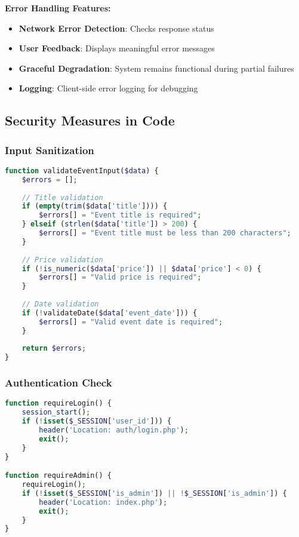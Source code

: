 \documentclass[12pt,a4paper]{article}
\begin{document}
\textbf{Error Handling Features:}
\begin{itemize}
    \item \textbf{Network Error Detection}: Checks response status
    \item \textbf{User Feedback}: Displays meaningful error messages
    \item \textbf{Graceful Degradation}: System remains functional during partial failures
    \item \textbf{Logging}: Client-side error logging for debugging
\end{itemize}

\subsection{Security Measures in Code}

\subsubsection{Input Sanitization}
\begin{lstlisting}[language=php, caption=Input Validation Example]
function validateEventInput($data) {
    $errors = [];
    
    // Title validation
    if (empty(trim($data['title']))) {
        $errors[] = "Event title is required";
    } elseif (strlen($data['title']) > 200) {
        $errors[] = "Event title must be less than 200 characters";
    }
    
    // Price validation
    if (!is_numeric($data['price']) || $data['price'] < 0) {
        $errors[] = "Valid price is required";
    }
    
    // Date validation
    if (!validateDate($data['event_date'])) {
        $errors[] = "Valid event date is required";
    }
    
    return $errors;
}
\end{lstlisting}

\subsubsection{Authentication Check}
\begin{lstlisting}[language=php, caption=Session Authentication]
function requireLogin() {
    session_start();
    if (!isset($_SESSION['user_id'])) {
        header('Location: auth/login.php');
        exit();
    }
}

function requireAdmin() {
    requireLogin();
    if (!isset($_SESSION['is_admin']) || !$_SESSION['is_admin']) {
        header('Location: index.php');
        exit();
    }
}
\end{lstlisting}
\end{document}
